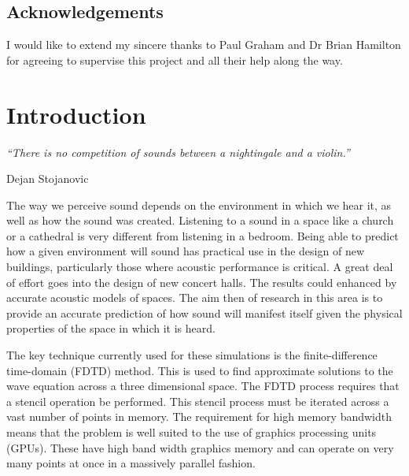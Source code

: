 \documentclass[12pt,a4paper]{report}
\begin{document}

\tableofcontents
\listoftables
\listoffigures
\listofalgorithms


\begin{titlepage}
\vspace*{2in}
\section*{Acknowledgements}

I would like to extend my sincere thanks to Paul Graham and Dr Brian Hamilton for agreeing to supervise this project and all their help along the way.

\end{titlepage}


\chapter{Introduction}
\epigraph{\itshape ``There is no competition of sounds between a nightingale and a violin.''}{Dejan Stojanovic}

The way we perceive sound depends on the environment in which we hear it, as well as how the sound was created. Listening to a sound in a space like a church or a cathedral is very different from listening in a bedroom. Being able to predict how a given environment will sound has practical use in the design of new buildings, particularly those where acoustic performance is critical. A great deal of effort goes into the design of new concert halls. The results could enhanced by accurate acoustic models of spaces. The aim then of research in this area is to provide an accurate prediction of how sound will manifest itself given the physical properties of the space in which it is heard.

The key technique currently used for these simulations is the finite-difference time-domain (FDTD) method. This is used to find approximate solutions to the wave equation across a three dimensional space. The FDTD process requires that a stencil operation be performed. This stencil process must be iterated across a vast number of points in memory. The requirement for high memory bandwidth means that the problem is well suited to the use of graphics processing units (GPUs). These have high band width graphics memory and can operate on very many points at once in a massively parallel fashion.
\end{document}
